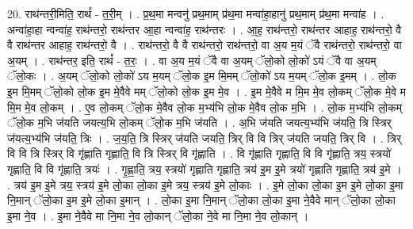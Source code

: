 \documentclass[17pt]{extarticle}
\begin{document}
20. राथ॑न्तरी॒मिति॒ राथं᳚ - त॒री॒म् । . प्र॒थ॒मा मन्वनु॑ प्रथ॒माम् प्र॑थ॒मा मन्वा॑हा॒हानु॑ प्रथ॒माम् प्र॑थ॒मा मन्वा॑ह । . अन्वा॑हा॒हा न्वन्वा॑ह॒ राथ॑न्तरो॒ राथ॑न्तर आ॒हा न्वन्वा॑ह॒ राथ॑न्तरः । . आ॒ह॒ राथ॑न्तरो॒ राथ॑न्तर आहाह॒ राथ॑न्तरो॒ वै वै राथ॑न्तर आहाह॒ राथ॑न्तरो॒ वै । . राथ॑न्तरो॒ वै वै राथ॑न्तरो॒ राथ॑न्तरो॒ वा अ॒य म॒यं ॅवै राथ॑न्तरो॒ राथ॑न्तरो॒ वा अ॒यम् । . राथ॑न्तर॒ इति॒ राथं᳚ - त॒रः॒ । . वा अ॒य म॒यं ॅवै वा अ॒यम् ॅलो॒को लो॒को॑ ऽयं ॅवै वा अ॒यम् ॅलो॒कः । . अ॒यम् ॅलो॒को लो॒को॑ ऽय म॒यम् ॅलो॒क इ॒म मि॒मम् ॅलो॒को॑ ऽय म॒यम् ॅलो॒क इ॒मम् । . लो॒क इ॒म मि॒मम् ॅलो॒को लो॒क इ॒म मे॒वैवे मम् ॅलो॒को लो॒क इ॒म मे॒व । . इ॒म मे॒वैवे म मि॒म मे॒व लो॒कम् ॅलो॒क मे॒वे म मि॒म मे॒व लो॒कम् । . ए॒व लो॒कम् ॅलो॒क मे॒वैव लो॒क म॒भ्य॑भि लो॒क मे॒वैव लो॒क म॒भि । . लो॒क म॒भ्य॑भि लो॒कम् ॅलो॒क म॒भि ज॑यति जयत्य॒भि लो॒कम् ॅलो॒क म॒भि ज॑यति । . अ॒भि ज॑यति जयत्य॒भ्य॑भि ज॑यति॒ त्रि स्त्रिर् ज॑यत्य॒भ्य॑भि ज॑यति॒ त्रिः । . ज॒य॒ति॒ त्रि स्त्रिर् ज॑यति जयति॒ त्रिर् वि वि त्रिर् ज॑यति जयति॒ त्रिर् वि । . त्रिर् वि वि त्रि स्त्रिर् वि गृ॑ह्णाति गृह्णाति॒ वि त्रि स्त्रिर् वि गृ॑ह्णाति । . वि गृ॑ह्णाति गृह्णाति॒ वि वि गृ॑ह्णाति॒ त्रय॒ स्त्रयो॑ गृह्णाति॒ वि वि गृ॑ह्णाति॒ त्रयः॑ । . गृ॒ह्णा॒ति॒ त्रय॒ स्त्रयो॑ गृह्णाति गृह्णाति॒ त्रय॑ इ॒म इ॒मे त्रयो॑ गृह्णाति गृह्णाति॒ त्रय॑ इ॒मे । . त्रय॑ इ॒म इ॒मे त्रय॒ स्त्रय॑ इ॒मे लो॒का लो॒का इ॒मे त्रय॒ स्त्रय॑ इ॒मे लो॒काः । . इ॒मे लो॒का लो॒का इ॒म इ॒मे लो॒का इ॒मा नि॒मान् ॅलो॒का इ॒म इ॒मे लो॒का इ॒मान् । . लो॒का इ॒मा नि॒मान् ॅलो॒का लो॒का इ॒मा ने॒वैवे मान् ॅलो॒का लो॒का इ॒मा ने॒व । . इ॒मा ने॒वैवे मा नि॒मा ने॒व लो॒कान् ॅलो॒का ने॒वे मा नि॒मा ने॒व लो॒कान् । \newline
\end{document}
